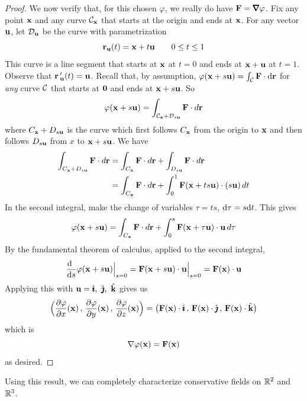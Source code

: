 \begin{proof}
We now verify that, for this chosen $\varphi$, we really do have $\vF=\vnabla\varphi$.
Fix any point $\mathbf{x}$ and any curve $\mathcal{C}_{\mathbf{x}}$ that
starts at the origin and ends at $\mathbf{x}$. 
For any vector $\mathbf{u}$, let $\mathcal{D}_{\mathbf{u}}$ be the curve with parametrization
\begin{equation*}
\mathbf{r}_{\mathbf{u}}(t)=\mathbf{x}+t\mathbf{u}\qquad 0\le t\le 1
\end{equation*}
This curve is a line segment that starts at $\mathbf{x}$ at $t=0$ and ends at $\mathbf{x}+\mathbf{u}$ at $t=1$.
Observe that ${\mathbf{r}\,}'_{\mathbf{u}}(t)=\mathbf{u}$.
Recall that, by assumption, $\varphi(\mathbf{x}+s\mathbf{u})=\int_{\mathcal{C}}\mathbf{F}\cdot\mathrm{d}\mathbf{r}$ for \emph{any} 
curve $\mathcal{C}$ that starts at $\mathbf{0}$ and ends at $\mathbf{x}+s\mathbf{u}$. So
\begin{equation*}
\varphi(\mathbf{x}+s\mathbf{u})
=\int_{\mathcal{C}_{\mathbf{x}}+\mathcal{D}_{s\mathbf{u}}}\mathbf{F}\cdot d\mathbf{r}
\end{equation*}
where $C_{\mathbf{x}}+D_{s\mathbf{u}}$ is the curve which first follows 
$C_{\mathbf{x}}$ from the origin to $\mathbf{x}$ and then follows $D_{s\mathbf{u}}$
from $x$ to $\mathbf{x}+s\mathbf{u}$. We have
\begin{align*}
\int_{C_{\mathbf{x}}+D_{s\mathbf{u}}}\mathbf{F}\cdot d\mathbf{r}
&=\int_{C_{\mathbf{x}}}\mathbf{F}\cdot d\mathbf{r}
+\int_{D_{s\mathbf{u}}}\mathbf{F}\cdot d\mathbf{r} \\
&=\int_{C_{\mathbf{x}}}\mathbf{F}\cdot d\mathbf{r}
+\int_0^1 \mathbf{F}(\mathbf{x}+ts\mathbf{u})\cdot (s\mathbf{u})\,dt
\end{align*}
In the second integral, make the change of variables 
$\tau=ts$, $\mathrm{d}\tau=s\mathrm{d}t$. This  gives 
\begin{equation*}
\varphi(\mathbf{x}+s\mathbf{u})=\int_{C_{\mathbf{x}}}\mathbf{F}\cdot d\mathbf{r}
+\int_0^s \mathbf{F}(\mathbf{x}+\tau\mathbf{u})\cdot \mathbf{u}\,d\tau
\end{equation*}
By the fundamental theorem of calculus, applied to the second integral,
\begin{equation*}
\diff{\ }{s}\varphi(\vx+s\vu)\Big|_{s=0}
=\vF(\vx+s\vu)\cdot \vu\Big|_{s=0}=\vF(\vx)\cdot \vu
\end{equation*}
Applying this with $\mathbf{u}=\hat{\pmb{\imath}},\ \hat{\pmb{\jmath}},\ \hat{\mathbf{k}}$ gives us
\begin{equation*}
\Big(\frac{\partial\varphi}{\partial x}(\mathbf{x})\,,\,
     \frac{\partial\varphi}{\partial y}(\mathbf{x})\,,\,
     \frac{\partial\varphi}{\partial z}(\mathbf{x})\Big) 
=\big(\mathbf{F}(\mathbf{x})\cdot\hat{\pmb{\imath}}\,,\,\mathbf{F}(\mathbf{x})\cdot\hat{\pmb{\jmath}}\,,\,\mathbf{F}(\mathbf{x})\cdot\hat{\mathbf{k}}\big)
\end{equation*}
which is
\begin{equation*}
\nabla\varphi(\mathbf{x})=\mathbf{F}(\mathbf{x})
\end{equation*}
as desired.
\end{proof}
Using this result, we can completely characterize conservative fields on
$\mathbb{R}^2$ and $\mathbb{R}^3$.

